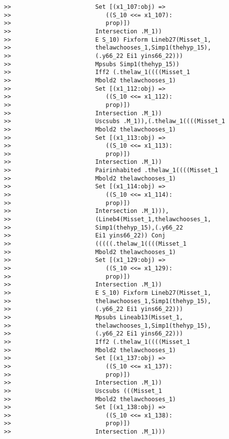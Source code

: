 \documentclass[12pt]{article}
\begin{document}
\begin{verbatim}
>>                        Set [(x1_107:obj) =>
>>                           ((S_10 <<= x1_107):
>>                           prop)])
>>                        Intersection .M_1))
>>                        E S_10) Fixform Lineb27(Misset_1,
>>                        thelawchooses_1,Simp1(thehyp_15),
>>                        (.y66_22 Ei1 yins66_22)))
>>                        Mpsubs Simp1(thehyp_15))
>>                        Iff2 (.thelaw_1((((Misset_1
>>                        Mbold2 thelawchooses_1)
>>                        Set [(x1_112:obj) =>
>>                           ((S_10 <<= x1_112):
>>                           prop)])
>>                        Intersection .M_1))
>>                        Uscsubs .M_1)),(.thelaw_1((((Misset_1
>>                        Mbold2 thelawchooses_1)
>>                        Set [(x1_113:obj) =>
>>                           ((S_10 <<= x1_113):
>>                           prop)])
>>                        Intersection .M_1))
>>                        Pairinhabited .thelaw_1((((Misset_1
>>                        Mbold2 thelawchooses_1)
>>                        Set [(x1_114:obj) =>
>>                           ((S_10 <<= x1_114):
>>                           prop)])
>>                        Intersection .M_1))),
>>                        (Lineb4(Misset_1,thelawchooses_1,
>>                        Simp1(thehyp_15),(.y66_22
>>                        Ei1 yins66_22)) Conj
>>                        (((((.thelaw_1((((Misset_1
>>                        Mbold2 thelawchooses_1)
>>                        Set [(x1_129:obj) =>
>>                           ((S_10 <<= x1_129):
>>                           prop)])
>>                        Intersection .M_1))
>>                        E S_10) Fixform Lineb27(Misset_1,
>>                        thelawchooses_1,Simp1(thehyp_15),
>>                        (.y66_22 Ei1 yins66_22)))
>>                        Mpsubs Lineab13(Misset_1,
>>                        thelawchooses_1,Simp1(thehyp_15),
>>                        (.y66_22 Ei1 yins66_22)))
>>                        Iff2 (.thelaw_1((((Misset_1
>>                        Mbold2 thelawchooses_1)
>>                        Set [(x1_137:obj) =>
>>                           ((S_10 <<= x1_137):
>>                           prop)])
>>                        Intersection .M_1))
>>                        Uscsubs (((Misset_1
>>                        Mbold2 thelawchooses_1)
>>                        Set [(x1_138:obj) =>
>>                           ((S_10 <<= x1_138):
>>                           prop)])
>>                        Intersection .M_1)))

\end{verbatim}
\end{document}
